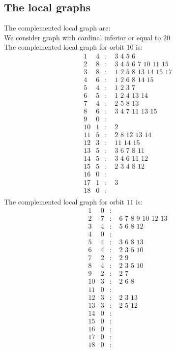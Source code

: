 \documentclass[12pt]{article}
\begin{document}
\subsection{The local graphs}
The complemented local graph are:\\
We consider graph with cardinal inferior or equal to $20$\\
The complemented local graph for orbit $10$ is:
\begin{equation*}
\begin{array}{rrcl}
1&4&:&\,\,3\,\,4\,\,5\,\,6\\
2&8&:&\,\,3\,\,4\,\,5\,\,6\,\,7\,\,10\,\,11\,\,15\\
3&8&:&\,\,1\,\,2\,\,5\,\,8\,\,13\,\,14\,\,15\,\,17\\
4&6&:&\,\,1\,\,2\,\,6\,\,8\,\,14\,\,15\\
5&4&:&\,\,1\,\,2\,\,3\,\,7\\
6&5&:&\,\,1\,\,2\,\,4\,\,13\,\,14\\
7&4&:&\,\,2\,\,5\,\,8\,\,13\\
8&6&:&\,\,3\,\,4\,\,7\,\,11\,\,13\,\,15\\
9&0&:&\\
10&1&:&\,\,2\\
11&5&:&\,\,2\,\,8\,\,12\,\,13\,\,14\\
12&3&:&\,\,11\,\,14\,\,15\\
13&5&:&\,\,3\,\,6\,\,7\,\,8\,\,11\\
14&5&:&\,\,3\,\,4\,\,6\,\,11\,\,12\\
15&5&:&\,\,2\,\,3\,\,4\,\,8\,\,12\\
16&0&:&\\
17&1&:&\,\,3\\
18&0&:&\\
\end{array}
\end{equation*}
The complemented local graph for orbit $11$ is:
\begin{equation*}
\begin{array}{rrcl}
1&0&:&\\
2&7&:&\,\,6\,\,7\,\,8\,\,9\,\,10\,\,12\,\,13\\
3&4&:&\,\,5\,\,6\,\,8\,\,12\\
4&0&:&\\
5&4&:&\,\,3\,\,6\,\,8\,\,13\\
6&4&:&\,\,2\,\,3\,\,5\,\,10\\
7&2&:&\,\,2\,\,9\\
8&4&:&\,\,2\,\,3\,\,5\,\,10\\
9&2&:&\,\,2\,\,7\\
10&3&:&\,\,2\,\,6\,\,8\\
11&0&:&\\
12&3&:&\,\,2\,\,3\,\,13\\
13&3&:&\,\,2\,\,5\,\,12\\
14&0&:&\\
15&0&:&\\
16&0&:&\\
17&0&:&\\
18&0&:&\\
\end{array}
\end{equation*}
\end{document}
